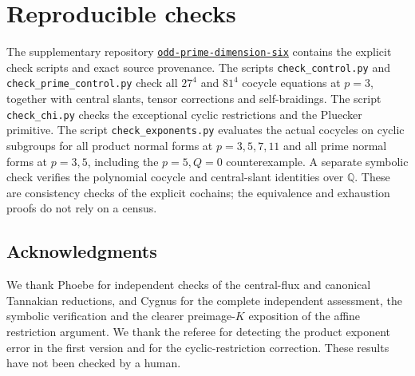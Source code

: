 \documentclass[11pt]{amsart}
\theoremstyle{definition}\newtheorem{definition}[theorem]{Definition}
\begin{document}
\section{Reproducible checks}
The supplementary repository
\href{https://github.com/numina-agents/odd-prime-dimension-six}{\texttt{odd-prime-dimension-six}} contains the
explicit check scripts and exact source provenance. The scripts
\texttt{check\_control.py} and \texttt{check\_prime\_control.py} check all
$27^4$ and $81^4$ cocycle equations at $p=3$, together with central slants,
tensor corrections and self-braidings. The script \texttt{check\_chi.py}
checks the exceptional cyclic restrictions and the Pluecker primitive.
The script \texttt{check\_exponents.py} evaluates the actual cocycles on
cyclic subgroups for all product normal forms at $p=3,5,7,11$ and all prime
normal forms at $p=3,5$, including the $p=5,Q=0$ counterexample.
A separate symbolic check verifies the polynomial cocycle and central-slant
identities over $\mathbb Q$. These are consistency checks of the explicit
cochains; the equivalence and exhaustion proofs do not rely on a census.

\subsection*{Acknowledgments}
We thank Phoebe for independent checks of the central-flux and canonical
Tannakian reductions, and Cygnus for the complete independent assessment,
the symbolic verification and the clearer preimage-$K$ exposition of the
affine restriction argument. We thank the referee for detecting the product
exponent error in the first version and for the cyclic-restriction correction.
These results have not been checked by a human.
\end{document}
